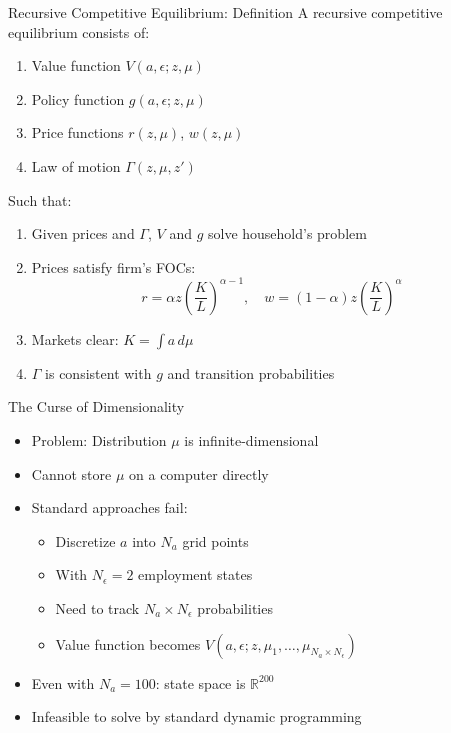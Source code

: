 \documentclass[aspectratio=169]{beamer}
\newcommand{\1}{\mathbf{1}}
\begin{document}
\begin{frame}{Recursive Competitive Equilibrium: Definition}
  \small
  A recursive competitive equilibrium consists of:
  \begin{enumerate}
      \item Value function $V(a, \epsilon; z, \mu)$
      \item Policy function $g(a, \epsilon; z, \mu)$
      \item Price functions $r(z, \mu)$, $w(z, \mu)$
      \item Law of motion $\Gamma(z, \mu, z')$
  \end{enumerate}
  Such that:
  \begin{enumerate}
      \item[(i)] Given prices and $\Gamma$, $V$ and $g$ solve household's problem
      \item[(ii)] Prices satisfy firm's FOCs:
      \[
      r = \alpha z \left(\frac{K}{L}\right)^{\alpha-1}, \quad w = (1-\alpha) z \left(\frac{K}{L}\right)^{\alpha}
      \]
      \item[(iii)] Markets clear: $K = \int a \, d\mu$
      \item[(iv)] $\Gamma$ is consistent with $g$ and transition probabilities
  \end{enumerate}
\end{frame}


\begin{frame}{The Curse of Dimensionality}
  \begin{itemize}
      \item Problem: Distribution $\mu$ is infinite-dimensional
      \item Cannot store $\mu$ on a computer directly
      \item Standard approaches fail:
      \begin{itemize}
          \item Discretize $a$ into $N_a$ grid points
          \item With $N_\epsilon = 2$ employment states
          \item Need to track $N_a \times N_\epsilon$ probabilities
          \item Value function becomes $V(a, \epsilon; z, \mu_1, \ldots, \mu_{N_a \times N_\epsilon})$
      \end{itemize}
      \item Even with $N_a = 100$: state space is $\mathbb{R}^{200}$
      \item Infeasible to solve by standard dynamic programming
  \end{itemize}
\end{frame}
\end{document}
